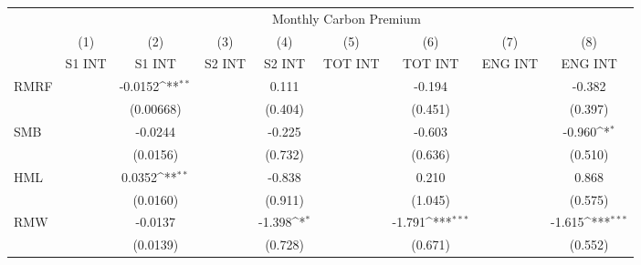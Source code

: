 {
\def\sym#1{\ifmmode^{#1}\else\(^{#1}\)\fi}
\begin{tabular}{l*{8}{c}}
\hline\hline
                    &\multicolumn{8}{c}{Monthly Carbon Premium}                                                                                                                                     \\\cmidrule(lr){2-9}
                    &\multicolumn{1}{c}{(1)}&\multicolumn{1}{c}{(2)}&\multicolumn{1}{c}{(3)}&\multicolumn{1}{c}{(4)}&\multicolumn{1}{c}{(5)}&\multicolumn{1}{c}{(6)}&\multicolumn{1}{c}{(7)}&\multicolumn{1}{c}{(8)}\\
                    &\multicolumn{1}{c}{S1 INT}&\multicolumn{1}{c}{S1 INT}&\multicolumn{1}{c}{S2 INT}&\multicolumn{1}{c}{S2 INT}&\multicolumn{1}{c}{TOT INT}&\multicolumn{1}{c}{TOT INT}&\multicolumn{1}{c}{ENG INT}&\multicolumn{1}{c}{ENG INT}\\
\hline
RMRF                &                     &     -0.0152\sym{**} &                     &       0.111         &                     &      -0.194         &                     &      -0.382         \\
                    &                     &   (0.00668)         &                     &     (0.404)         &                     &     (0.451)         &                     &     (0.397)         \\
SMB                 &                     &     -0.0244         &                     &      -0.225         &                     &      -0.603         &                     &      -0.960\sym{*}  \\
                    &                     &    (0.0156)         &                     &     (0.732)         &                     &     (0.636)         &                     &     (0.510)         \\
HML                 &                     &      0.0352\sym{**} &                     &      -0.838         &                     &       0.210         &                     &       0.868         \\
                    &                     &    (0.0160)         &                     &     (0.911)         &                     &     (1.045)         &                     &     (0.575)         \\
RMW                 &                     &     -0.0137         &                     &      -1.398\sym{*}  &                     &      -1.791\sym{***}&                     &      -1.615\sym{***}\\
                    &                     &    (0.0139)         &                     &     (0.728)         &                     &     (0.671)         &                     &     (0.552)         \\

\end{tabular}}

